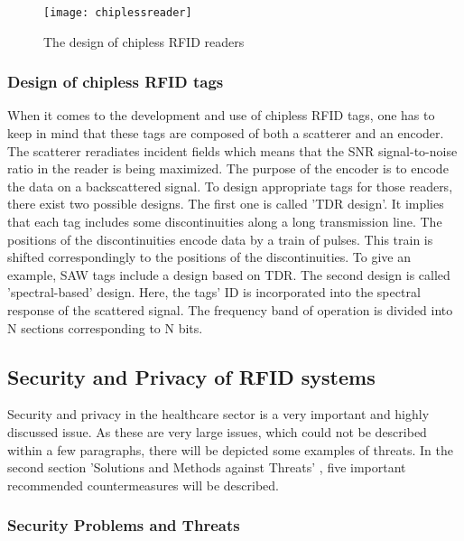 \begin{figure}
\centering
\texttt{[image: chiplessreader]}
\caption{\label{fig:chipless_reader} The design of chipless RFID readers \cite[p.20]{chipless}} 
\end{figure}

\subsubsection{Design of chipless RFID tags} 

When it comes to the development and use of chipless RFID tags, one has to keep in mind that these tags are composed of both a scatterer and an encoder. The scatterer reradiates incident fields which means that the \ac{SNR} signal-to-noise ratio in the reader is being maximized. The purpose of the encoder is to encode the data on a backscattered signal. 
To design appropriate tags for those readers, there exist two possible designs. The first one is called '\ac{TDR} design'. It implies that each tag includes some discontinuities along a long transmission line. The positions of the discontinuities encode data by a train of pulses. This train is shifted correspondingly to the positions of the discontinuities. To give an example, \ac{SAW} tags include a design based on TDR. The second design is called 'spectral-based' design. Here, the tags' ID is incorporated into the spectral response of the scattered signal. The frequency band of operation is divided into N sections corresponding to N bits. 

\subsection{Security and Privacy of RFID systems}

Security and privacy in the healthcare sector is a very important and highly discussed issue. As these are very large issues, which could not be described within a few paragraphs, there will be depicted some examples of threats. In the second section 'Solutions and Methods against Threats' \pageref{solution}, five important recommended countermeasures will be described.

\subsubsection{Security Problems and Threats} \label{problems}
 
